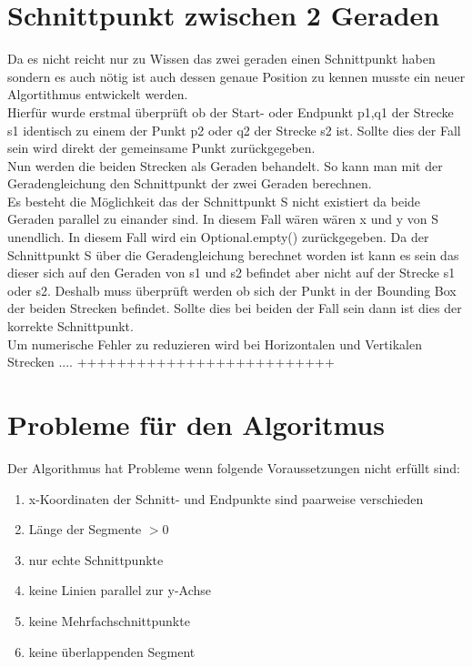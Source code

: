 \documentclass[conference]{IEEEtran}
\begin{document}
	\section{Schnittpunkt zwischen 2 Geraden }
	Da es nicht reicht nur zu Wissen das zwei geraden einen Schnittpunkt haben sondern es auch nötig ist auch dessen genaue Position zu kennen musste ein neuer Algortithmus entwickelt werden.\\
	Hierfür wurde erstmal überprüft ob der Start- oder Endpunkt p1,q1 der Strecke s1 identisch zu einem der Punkt p2 oder q2 der Strecke s2 ist. Sollte dies der Fall sein wird direkt der gemeinsame Punkt zurückgegeben.\\
	Nun werden die beiden Strecken als Geraden behandelt. So kann man mit der Geradengleichung den Schnittpunkt der zwei Geraden berechnen.\\
	\[  \]
	Es besteht die Möglichkeit das der Schnittpunkt S nicht existiert da beide Geraden parallel zu einander sind. In diesem Fall wären wären x und y von S unendlich. In diesem Fall wird ein Optional.empty() zurückgegeben.
	Da der Schnittpunkt S über die Geradengleichung berechnet worden ist kann es sein das dieser sich auf den Geraden von s1 und s2 befindet aber nicht auf der Strecke s1 oder s2. Deshalb muss überprüft werden ob sich der Punkt in der Bounding Box der beiden Strecken befindet. Sollte dies bei beiden der Fall sein dann ist dies der korrekte Schnittpunkt.\\
	Um numerische Fehler zu reduzieren wird bei Horizontalen und Vertikalen Strecken ....
	++++++++++++++++++++++++++
	\section{Probleme für den Algoritmus}
	Der Algorithmus hat Probleme wenn folgende Voraussetzungen nicht erfüllt sind:
	\begin{enumerate}
		\item x-Koordinaten der Schnitt- und Endpunkte sind paarweise verschieden
		
		\item Länge der Segmente $> 0$
		
		\item nur echte Schnittpunkte
		
		\item keine Linien parallel zur y-Achse
		
		\item keine Mehrfachschnittpunkte
		
		\item keine überlappenden Segment
	\end{enumerate}
	
\end{document}

